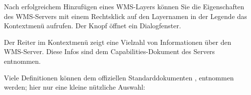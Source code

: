 Nach erfolgreichem Hinzufügen eines WMS-Layers können Sie die Eigenschaften
des WMS-Servers mit einem Rechtsklick auf den Layernamen in der Legende das
Kontextmenü aufrufen. Der Knopf  öffnet ein Dialogfenster.

\label{sec:ogc-wms-properties-metadata}

Der Reiter  im Kontextmenü zeigt eine Vielzahl von
Informationen über den WMS-Server. Diese Infos sind dem Capabilities-Dokument
des Servers entnommen.

Viele Definitionen können dem offiziellen Standarddokumenten
\cite{OGCWMS010101web}, \cite{OGCWMS010300web} entnommen werden; hier nur
eine kleine nützliche Auswahl:

